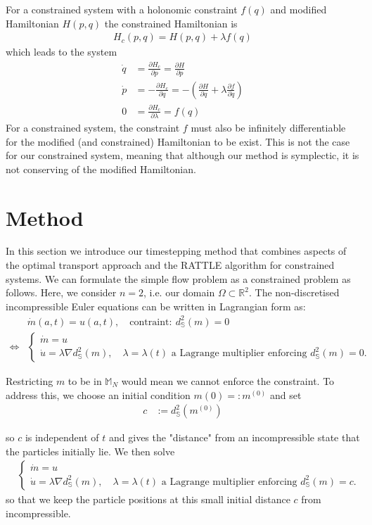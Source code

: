 \documentclass[11pt, oneside]{article}   	%
\newcommand{\R}{\mathbb{R}}
\newcommand{\MN}{\mathbb{M}_N}
\newcommand{\dsmsq}{d^{2}_{\mathbb{S}}(m)}
\newcommand{\graddsmsq}{\nabla{d^{2}_{\mathbb{S}}(m)}}
\begin{document}
For a constrained system with a holonomic constraint \(f(q)\) and modified Hamiltonian \(H(p, q)\) the constrained Hamiltonian is
\begin{align}
H_c(p, q) = H(p, q) + \lambda f(q)
\end{align}
which leads to the system
\begin{align}
\dot{q} &= \frac{\partial H_c}{\partial p} = \frac{\partial H}{\partial p} \\
\dot{p} &= - \frac{\partial H_c}{\partial q} = - (\frac{\partial H}{\partial q} + \lambda \frac{\partial f}{\partial q})\\
0 &= \frac{\partial H_c}{\partial \lambda} = f(q)
\end{align}
For a constrained system, the constraint \(f\) must also be infinitely differentiable for the modified (and constrained) Hamiltonian to be exist. This is not the case for our constrained system, meaning that although our method is symplectic, it is not conserving of the modified Hamiltonian.


\section{Method}

In this section we introduce our timestepping method that combines aspects of the optimal transport approach and the RATTLE algorithm for constrained systems. We can formulate the simple flow problem as a constrained problem as follows. Here, we consider \(n=2\), i.e. our domain \(\Omega \subset \R^2\). The non-discretised incompressible Euler equations can be written in Lagrangian form as:
\begin{align}
& \dot{m}(a, t) = u(a,t), \quad \text{contraint}: \: \dsmsq = 0 \\
\iff
 &\begin{cases}
  \dot{m} = u \\
  \dot{u} = \lambda \graddsmsq, \quad \lambda = \lambda(t) \text{ a Lagrange multiplier enforcing } \dsmsq = 0.
 \end{cases} 
\end{align}

Restricting \(m\) to be in \(\MN\) would mean we cannot enforce the constraint. To address this, we choose an initial condition \(m(0) =: m^{(0)}\) and set
\begin{align}
c &:= d^{2}_{\mathbb{S}}(m^{(0)})
\end{align}

so \(c\) is independent of \(t\) and gives the "distance" from an incompressible state that the particles initially lie. We then solve
\begin{align}
 &\begin{cases}
  \dot{m} = u \\
  \dot{u} = \lambda \graddsmsq, \quad \lambda = \lambda(t) \text{ a Lagrange multiplier enforcing } \dsmsq = c.
 \end{cases} 
\end{align}
so that we keep the particle positions at this small initial distance \(c\) from incompressible.
\end{document}
